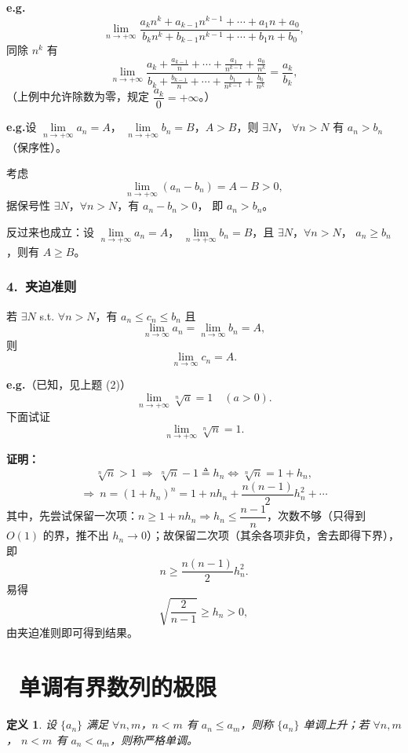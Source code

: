 \documentclass[UTF8,11pt]{ctexart}
\theoremstyle{cnthm}
\newtheorem{defn}[thm]{定义}
\begin{document}
\medskip

\textbf{e.g.}
\[
\lim_{n\to+\infty}
\frac{a_kn^k+a_{k-1}n^{k-1}+\cdots+a_1n+a_0}
{b_kn^k+b_{k-1}n^{k-1}+\cdots+b_1n+b_0},
\]
同除 $n^k$ 有
\[
\lim_{n\to+\infty}
\frac{a_k+\frac{a_{k-1}}{n}+\cdots+\frac{a_1}{n^{k-1}}
+\frac{a_0}{n^k}}
{b_k+\frac{b_{k-1}}{n}+\cdots+\frac{b_1}{n^{k-1}}
+\frac{b_0}{n^k}}
=\frac{a_k}{b_k},
\]
（上例中允许除数为零，规定 $\dfrac{a_k}{0}=+\infty$。）

\medskip

\textbf{e.g.}\quad 设 $\lim\limits_{n\to+\infty}a_n=A$，
$\lim\limits_{n\to+\infty}b_n=B$，$A>B$，则 $\exists N$，
$\forall n>N$ 有 $a_n>b_n$（保序性）。

考虑
\[
\lim_{n\to+\infty}(a_n-b_n)=A-B>0,
\]
据保号性 $\exists N$，$\forall n>N$，有 $a_n-b_n>0$，
即 $a_n>b_n$。

反过来也成立：设 $\lim\limits_{n\to+\infty}a_n=A$，
$\lim\limits_{n\to+\infty}b_n=B$，且 $\exists N$，$\forall n>N$，
$a_n\geq b_n$，则有 $A\geq B$。

\subsubsection*{4.\ 夹迫准则}

若 $\exists N$ s.t. $\forall n>N$，有
$a_n\leq c_n\leq b_n$ 且
\[
\lim_{n\to\infty}a_n=\lim_{n\to\infty}b_n=A,
\]
则
\[
\lim_{n\to\infty}c_n=A .
\]

\medskip

\textbf{e.g.}（已知，见上题 (2)）
\[
\lim_{n\to+\infty}\sqrt[n]{a}=1\quad(a>0).
\]
下面试证
\[
\lim_{n\to+\infty}\sqrt[n]{n}=1 .
\]

\textbf{证明：}\quad
\[
\sqrt[n]{n}>1\ \Longrightarrow\
\sqrt[n]{n}-1\triangleq h_n
\iff \sqrt[n]{n}=1+h_n,
\]
\[
\Longrightarrow\ n=(1+h_n)^n
=1+nh_n+\frac{n(n-1)}{2}h_n^2+\cdots
\]
其中，先尝试保留一次项：$n\geq1+nh_n\Rightarrow h_n\leq\dfrac{n-1}{n}$，次数不够（只得到 $O(1)$ 的界，推不出 $h_n\to0$）；故保留二次项（其余各项非负，舍去即得下界），即
\[
n\geq\frac{n(n-1)}{2}h_n^2 .
\]
易得
\[
\sqrt{\frac{2}{n-1}}\geq h_n>0,
\]
由夹迫准则即可得到结果。

\section{\ 单调有界数列的极限}

\begin{defn}
设 $\{a_n\}$ 满足 $\forall n,m$，$n<m$ 有
$a_n\leq a_m$，则称 $\{a_n\}$ 单调上升；若 $\forall n,m$，
$n<m$ 有 $a_n<a_m$，则称严格单调。
\end{defn}
\end{document}
